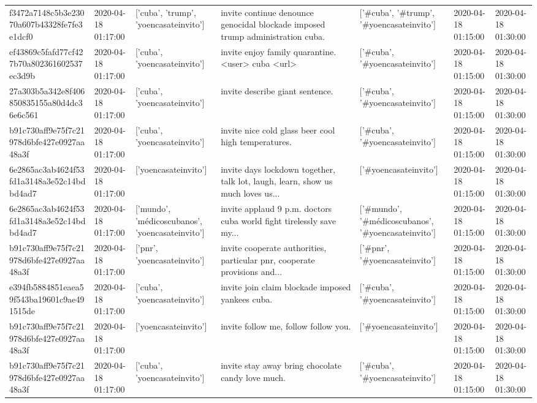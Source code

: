 \begin{tabular}{lllllll}
f3472a7148c5b3e23070a607b43328fe7fe3e1dcf0 & 2020-04-18 01:17:00 & ['cuba', 'trump', 'yoencasateinvito'] & invite continue denounce genocidal blockade imposed trump administration cuba. & ['#cuba', '#trump', '#yoencasateinvito'] & 2020-04-18 01:15:00 & 2020-04-18 01:30:00 \\
ef43869c5fafd77cf427b70a802361602537ec3d9b & 2020-04-18 01:17:00 & ['cuba', 'yoencasateinvito'] & invite enjoy family quarantine. <user> cuba <url> & ['#cuba', '#yoencasateinvito'] & 2020-04-18 01:15:00 & 2020-04-18 01:30:00 \\
27a303b5a342e8f406850835155a80d4dc36e6c561 & 2020-04-18 01:17:00 & ['cuba', 'yoencasateinvito'] & invite describe giant sentence. & ['#cuba', '#yoencasateinvito'] & 2020-04-18 01:15:00 & 2020-04-18 01:30:00 \\
b91c730aff9e75f7c21978d6bfe427e0927aa48a3f & 2020-04-18 01:17:00 & ['cuba', 'yoencasateinvito'] & invite nice cold glass beer cool high temperatures. & ['#cuba', '#yoencasateinvito'] & 2020-04-18 01:15:00 & 2020-04-18 01:30:00 \\
6e2865ac3ab4624f53fd1a3148a3e52c14bdbd4ad7 & 2020-04-18 01:17:00 & ['yoencasateinvito'] & invite days lockdown together, talk lot, laugh, learn, show us much loves us... & ['#yoencasateinvito'] & 2020-04-18 01:15:00 & 2020-04-18 01:30:00 \\
6e2865ac3ab4624f53fd1a3148a3e52c14bdbd4ad7 & 2020-04-18 01:17:00 & ['mundo', 'médicoscubanos', 'yoencasateinvito'] & invite applaud 9 p.m. doctors cuba world fight tirelessly save my... & ['#mundo', '#médicoscubanos', '#yoencasateinvito'] & 2020-04-18 01:15:00 & 2020-04-18 01:30:00 \\
b91c730aff9e75f7c21978d6bfe427e0927aa48a3f & 2020-04-18 01:17:00 & ['pnr', 'yoencasateinvito'] & invite cooperate authorities, particular pnr, cooperate provisions and... & ['#pnr', '#yoencasateinvito'] & 2020-04-18 01:15:00 & 2020-04-18 01:30:00 \\
e394fb5884851eaea59f543ba19601c9ae491515de & 2020-04-18 01:17:00 & ['cuba', 'yoencasateinvito'] & invite join claim blockade imposed yankees cuba. & ['#cuba', '#yoencasateinvito'] & 2020-04-18 01:15:00 & 2020-04-18 01:30:00 \\
b91c730aff9e75f7c21978d6bfe427e0927aa48a3f & 2020-04-18 01:17:00 & ['yoencasateinvito'] & invite follow me, follow follow you. & ['#yoencasateinvito'] & 2020-04-18 01:15:00 & 2020-04-18 01:30:00 \\
b91c730aff9e75f7c21978d6bfe427e0927aa48a3f & 2020-04-18 01:17:00 & ['cuba', 'yoencasateinvito'] & invite stay away bring chocolate candy love much. & ['#cuba', '#yoencasateinvito'] & 2020-04-18 01:15:00 & 2020-04-18 01:30:00 \\

\end{tabular}
